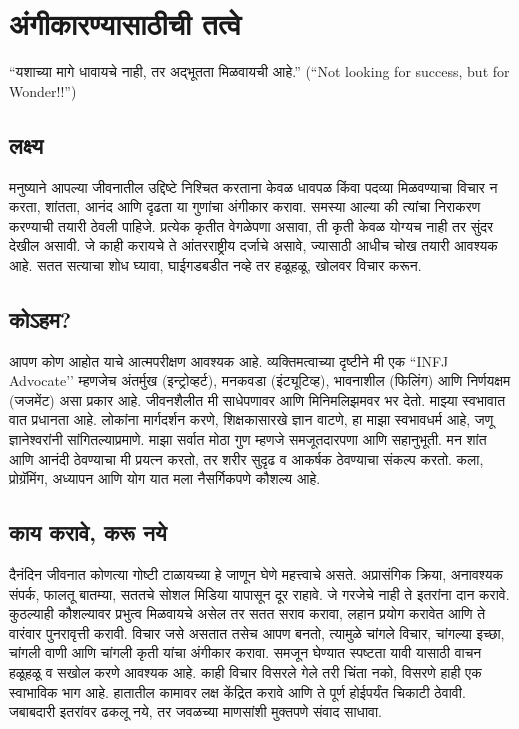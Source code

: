 \chapter{अंगीकारण्यासाठीची तत्वे}

``यशाच्या मागे धावायचे नाही, तर अद्भूतता मिळवायची आहे.'' (``Not looking for success, but for Wonder!!'')

\section*{लक्ष्य}
मनुष्याने आपल्या जीवनातील उद्दिष्टे निश्चित करताना केवळ धावपळ किंवा पदव्या मिळवण्याचा विचार न करता, शांतता, आनंद आणि दृढता या गुणांचा अंगीकार करावा. समस्या आल्या की त्यांचा निराकरण करण्याची तयारी ठेवली पाहिजे. प्रत्येक कृतीत वेगळेपणा असावा, ती कृती केवळ योग्यच नाही तर सुंदर देखील असावी. जे काही करायचे ते आंतरराष्ट्रीय दर्जाचे असावे, ज्यासाठी आधीच चोख तयारी आवश्यक आहे. सतत सत्याचा शोध घ्यावा, घाईगडबडीत नव्हे तर हळूहळू, खोलवर विचार करून.

\section*{कोऽहम?}
आपण कोण आहोत याचे आत्मपरीक्षण आवश्यक आहे. व्यक्तिमत्वाच्या दृष्टीने मी एक ``INFJ Advocate’’ म्हणजेच अंतर्मुख (इन्ट्रोव्हर्ट), मनकवडा (इंट्यूटिव्ह), भावनाशील (फिलिंग) आणि निर्णयक्षम (जजमेंट) असा प्रकार आहे. जीवनशैलीत मी साधेपणावर आणि मिनिमलिझमवर भर देतो. माझ्या स्वभावात वात प्रधानता आहे. लोकांना मार्गदर्शन करणे, शिक्षकासारखे ज्ञान वाटणे, हा माझा स्वभावधर्म आहे, जणू ज्ञानेश्वरांनी सांगितल्याप्रमाणे. माझा सर्वात मोठा गुण म्हणजे समजूतदारपणा आणि सहानुभूती. मन शांत आणि आनंदी ठेवण्याचा मी प्रयत्न करतो, तर शरीर सुदृढ व आकर्षक ठेवण्याचा संकल्प करतो. कला, प्रोग्रॅमिंग, अध्यापन आणि योग यात मला नैसर्गिकपणे कौशल्य आहे.

\section*{काय करावे, करू नये}
दैनंदिन जीवनात कोणत्या गोष्टी टाळायच्या हे जाणून घेणे महत्त्वाचे असते. अप्रासंगिक क्रिया, अनावश्यक संपर्क, फालतू बातम्या, सततचे सोशल मिडिया यापासून दूर राहावे. जे गरजेचे नाही ते इतरांना दान करावे. कुठल्याही कौशल्यावर प्रभुत्व मिळवायचे असेल तर सतत सराव करावा, लहान प्रयोग करावेत आणि ते वारंवार पुनरावृत्ती करावी. विचार जसे असतात तसेच आपण बनतो, त्यामुळे चांगले विचार, चांगल्या इच्छा, चांगली वाणी आणि चांगली कृती यांचा अंगीकार करावा. समजून घेण्यात स्पष्टता यावी यासाठी वाचन हळूहळू व सखोल करणे आवश्यक आहे. काही विचार विसरले गेले तरी चिंता नको, विसरणे हाही एक स्वाभाविक भाग आहे. हातातील कामावर लक्ष केंद्रित करावे आणि ते पूर्ण होईपर्यंत चिकाटी ठेवावी. जबाबदारी इतरांवर ढकलू नये, तर जवळच्या माणसांशी मुक्तपणे संवाद साधावा.

